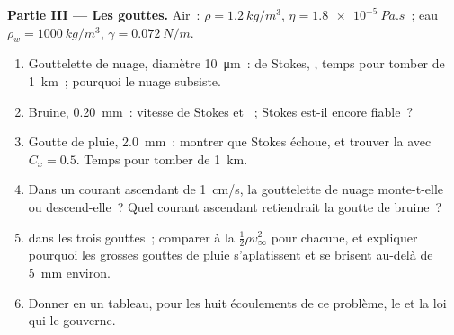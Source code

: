 \begin{problem}
\medskip
\noindent\textbf{Partie III --- Les gouttes.}
Air~: $\rho = \qty{1.2}{kg/m^3}$, $\eta = \qty{1.8e-5}{Pa.s}$~; eau $\rho_w =
\qty{1000}{kg/m^3}$, $\gamma = \qty{0.072}{N/m}$.
\begin{enumerate}[resume]
  \item Gouttelette de nuage, diamètre \qty{10}{\micro m}~:  de Stokes,
        , temps pour tomber de \qty{1}{km}~; pourquoi le nuage subsiste.
  \item Bruine, \qty{0.20}{mm}~: vitesse de Stokes et ~; Stokes
        est-il encore fiable~?
  \item Goutte de pluie, \qty{2.0}{mm}~: montrer que Stokes échoue, et trouver la  avec $C_x = 0.5$. Temps pour tomber de \qty{1}{km}.
  \item Dans un courant ascendant de \qty{1}{cm/s}, la gouttelette de nuage monte-t-elle ou
        descend-elle~? Quel courant ascendant retiendrait la goutte de bruine~?
  \item {} dans les trois gouttes~; comparer à la
         $\tfrac12\rho v_\infty^2$ pour chacune, et expliquer pourquoi
        les grosses gouttes de pluie s'aplatissent et se brisent au-delà de \qty{5}{mm} environ.
  \item Donner en un tableau, pour les huit écoulements de ce problème, le
         et la loi qui le gouverne.
\end{enumerate}
\end{problem}
